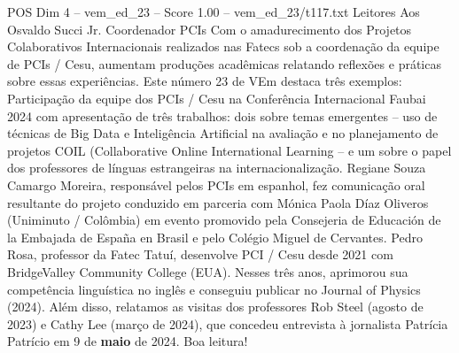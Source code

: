 \begin{textsample}{POS Dim 4 – vem\_ed\_23 – Score 1.00 – vem\_ed\_23/t117.txt}  \label{ex:f4_pos_095}
Leitores Aos Osvaldo Succi Jr.
Coordenador PCIs Com o amadurecimento dos Projetos Colaborativos Internacionais realizados nas Fatecs sob a coordenação da equipe de PCIs / Cesu, aumentam produções acadêmicas relatando reflexões e práticas sobre essas experiências.
Este número 23 de VEm destaca três exemplos: Participação da equipe dos PCIs / Cesu na Conferência Internacional Faubai 2024 com apresentação de três trabalhos: dois sobre temas emergentes – uso de técnicas de Big Data e Inteligência Artificial na avaliação e no planejamento de projetos COIL (Collaborative Online International Learning – e um sobre o papel dos professores de línguas estrangeiras na internacionalização.
Regiane Souza Camargo Moreira, responsável pelos PCIs em espanhol, fez comunicação oral resultante do projeto conduzido em parceria com Mónica Paola Díaz Oliveros (Uniminuto / Colômbia) em evento promovido pela Consejeria de Educación de la Embajada de España en Brasil e pelo Colégio Miguel de Cervantes.
Pedro Rosa, professor da Fatec Tatuí, desenvolve PCI / Cesu desde 2021 com BridgeValley Community College (EUA).
Nesses três anos, aprimorou sua competência linguística no inglês e conseguiu publicar no Journal of Physics (2024).
Além disso, relatamos as visitas dos professores Rob Steel (agosto de 2023) e Cathy Lee (março de 2024), que concedeu entrevista à jornalista Patrícia Patrício em 9 de \textbf{maio} de 2024.
Boa leitura!

\end{textsample}
